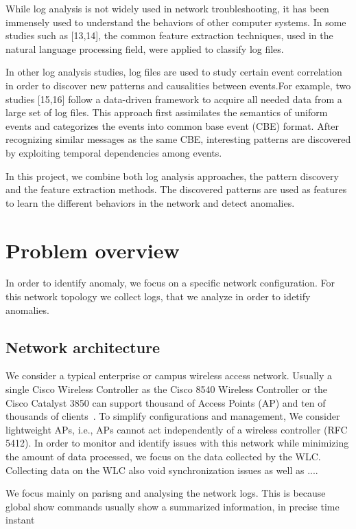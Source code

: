 \documentclass[conference]{IEEEtran}
\begin{document}
While log analysis is not widely used in network troubleshooting, it has been immensely used to understand the behaviors of other computer systems. In some studies such as [13,14], the common feature extraction techniques, used in the natural language processing field, were applied to classify log files.

In other log analysis studies, log files are used to study certain event correlation in order to discover new patterns and causalities between events.For example, two studies [15,16] follow a data-driven framework to acquire all needed data from a large set of log files. This approach first assimilates the semantics of uniform events and categorizes the events into common base event (CBE) format. After recognizing similar messages as the same CBE, interesting patterns are discovered by exploiting temporal dependencies among events.

In this project, we combine both log analysis approaches, the pattern discovery and the feature extraction methods. The discovered patterns are used as features to learn the different behaviors in the network and detect anomalies.

\section{Problem overview}
In order to identify anomaly, we focus on a specific network configuration. For this network topology we collect logs, that we analyze in order to idetify anomalies.

\subsection{Network architecture}
We consider a typical enterprise or campus wireless access network. Usually a single Cisco Wireless Controller as the Cisco 8540 Wireless Controller or the Cisco Catalyst 3850 can support thousand of Access Points (AP) and ten of thousands of clients~\cite{WLC-datasheets-site}. To simplify configurations and management, 
We consider lightweight APs, i.e., APs cannot act independently of a wireless controller (RFC 5412). In order to monitor and identify issues with this network while minimizing the amount of data processed, we focus on the data collected by the WLC. Collecting data on the WLC also void synchronization issues as well as .... 

We focus mainly on parisng and analysing the network logs. This is because global show commands usually show a summarized information, in precise time instant 
\end{document}
